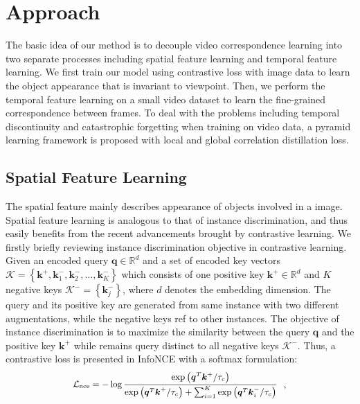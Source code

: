 \documentclass{article}
\begin{document}
\section{Approach}
The basic idea of our method is to decouple video correspondence learning into two separate processes including spatial feature learning and temporal feature learning. We first train our model using contrastive loss with image data to learn the object appearance that is invariant to viewpoint. Then, we perform the temporal feature learning on a small video dataset to learn the fine-grained correspondence between frames. To deal with the problems including temporal discontinuity and catastrophic forgetting when training on video data, a pyramid learning framework is proposed with local and global correlation distillation loss.

\subsection{Spatial Feature Learning}
\label{spatial_feature_learning}
The spatial feature mainly describes appearance of objects involved in a image. Spatial feature learning is analogous to that of instance discrimination, and thus easily benefits from the recent advancements brought by contrastive learning. We firstly briefly reviewing instance discrimination objective in contrastive learning. Given an encoded query $\boldsymbol{q}\in\mathbb{R}^d$ and a set of encoded key vectors $\mathcal{K}=\left\{\boldsymbol{k}^{+}, \boldsymbol{k}_{1}^{-}, \boldsymbol{k}_{2}^{-}, \ldots, \boldsymbol{k}_{K}^{-}\right\}$ which consists of one positive key $\boldsymbol{k}^{+}\in\mathbb{R}^d$ and $K$ negative keys $\mathcal{K^{-}}=\left\{\boldsymbol{k}_{j}^{-}\right\}$, where $d$ denotes the embedding dimension. The query and its positive key are generated from  same instance with two different augmentations, while the negative keys ref to other instances. The objective of instance discrimination is to maximize the similarity between the query $\boldsymbol{q}$ and the positive key $\boldsymbol{k}^{+}$ while remains query distinct to all negative keys $\mathcal{K^{-}}$. Thus, a contrastive loss is presented in InfoNCE  with a softmax formulation:
	\begin{equation}\label{eq:nce}
		\small
		\begin{aligned}
			\mathcal{L}_{\text{nce}}=-\log \frac{\exp \left(\boldsymbol{q}^{T} \boldsymbol{k}^{+} / \tau_c\right)}{\exp \left(\boldsymbol{q}^{T} \boldsymbol{k}^{+} / \tau_c\right)+\sum_{i=1}^{K} \exp \left(\boldsymbol{q}^{T} \boldsymbol{k}_{i}^{-} / \tau_c\right)}
		\end{aligned}~~,
	\end{equation}
\end{document}
